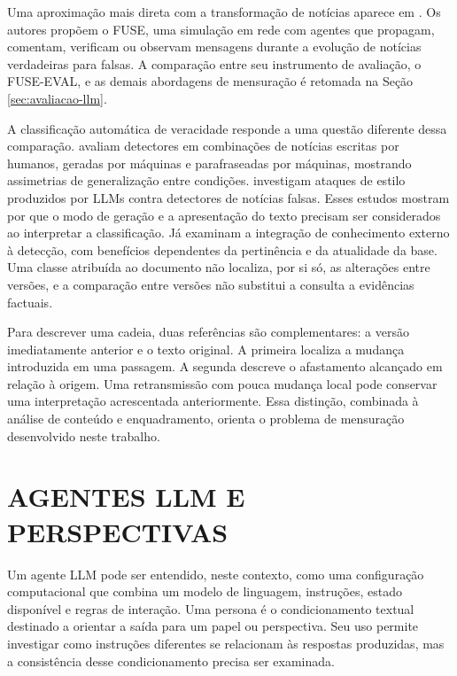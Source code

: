 Uma aproximação mais direta com a transformação de notícias aparece em . Os autores propõem o FUSE, uma simulação em rede com agentes que propagam, comentam, verificam ou observam mensagens durante a evolução de notícias verdadeiras para falsas. A comparação entre seu instrumento de avaliação, o FUSE-EVAL, e as demais abordagens de mensuração é retomada na Seção \ref{sec:avaliacao-llm}.

A classificação automática de veracidade responde a uma questão diferente dessa comparação.  avaliam detectores em combinações de notícias escritas por humanos, geradas por máquinas e parafraseadas por máquinas, mostrando assimetrias de generalização entre condições.  investigam ataques de estilo produzidos por LLMs contra detectores de notícias falsas. Esses estudos mostram por que o modo de geração e a apresentação do texto precisam ser considerados ao interpretar a classificação. Já  examinam a integração de conhecimento externo à detecção, com benefícios dependentes da pertinência e da atualidade da base. Uma classe atribuída ao documento não localiza, por si só, as alterações entre versões, e a comparação entre versões não substitui a consulta a evidências factuais.

Para descrever uma cadeia, duas referências são complementares: a versão imediatamente anterior e o texto original. A primeira localiza a mudança introduzida em uma passagem. A segunda descreve o afastamento alcançado em relação à origem. Uma retransmissão com pouca mudança local pode conservar uma interpretação acrescentada anteriormente. Essa distinção, combinada à análise de conteúdo e enquadramento, orienta o problema de mensuração desenvolvido neste trabalho.

\section{AGENTES LLM E PERSPECTIVAS}
\label{sec:agentes-personas}

Um agente LLM pode ser entendido, neste contexto, como uma configuração computacional que combina um modelo de linguagem, instruções, estado disponível e regras de interação. Uma persona é o condicionamento textual destinado a orientar a saída para um papel ou perspectiva. Seu uso permite investigar como instruções diferentes se relacionam às respostas produzidas, mas a consistência desse condicionamento precisa ser examinada.

